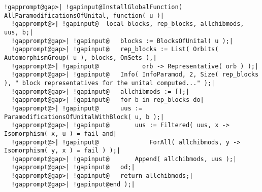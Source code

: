\documentclass[a4paper,11pt]{report}
\begin{document}
{{{\begin{Verbatim}[commandchars=!@|,fontsize=\small,frame=single,label=Example]
  !gapprompt@gap>| !gapinput@InstallGlobalFunction( AllParamodificationsOfUnital, function( u )|
  !gapprompt@>| !gapinput@	local blocks, rep_blocks, allchibmods, uus, b;|
  !gapprompt@gap>| !gapinput@	blocks := BlocksOfUnital( u );|
  !gapprompt@gap>| !gapinput@	rep_blocks := List( Orbits( AutomorphismGroup( u ), blocks, OnSets ),|
  !gapprompt@>| !gapinput@		      orb -> Representative( orb ) );|
  !gapprompt@gap>| !gapinput@	Info( InfoParamod, 2, Size( rep_blocks ), " block representatives for the unital computed..." );|
  !gapprompt@gap>| !gapinput@	allchibmods := [];|
  !gapprompt@gap>| !gapinput@	for b in rep_blocks do|
  !gapprompt@>| !gapinput@		uus := ParamodificationsOfUnitalWithBlock( u, b );|
  !gapprompt@gap>| !gapinput@		uus := Filtered( uus, x -> Isomorphism( x, u ) = fail and|
  !gapprompt@>| !gapinput@				ForAll( allchibmods, y -> Isomorphism( y, x ) = fail ) );|
  !gapprompt@gap>| !gapinput@		Append( allchibmods, uus );|
  !gapprompt@gap>| !gapinput@	od;|
  !gapprompt@gap>| !gapinput@	return allchibmods;|
  !gapprompt@gap>| !gapinput@end );|
\end{Verbatim}
 }

 }

 }

   
\end{document}
